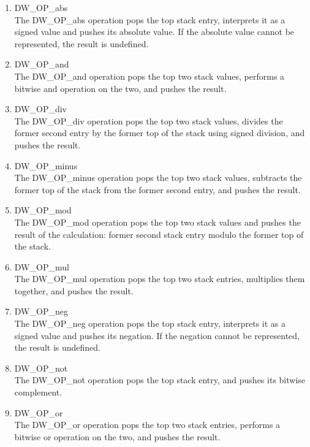 \begin{enumerate}[1]
\label{chap:DWOPabs}
\item DW\_OP\_abs  \\
The DW\_OP\_abs operation pops the top stack entry, interprets
it as a signed value and pushes its absolute value. If the
absolute value cannot be represented, the result is undefined.

\label{chap:DWOPand}
\item DW\_OP\_and \\
The DW\_OP\_and operation pops the top two stack values, performs
a bitwise and operation on the two, and pushes the result.

\label{chap:DWOPdiv}
\item DW\_OP\_div \\
The DW\_OP\_div operation pops the top two stack values, divides the former second entry by
the former top of the stack using signed division, and pushes the result.

\label{chap:DWOPminus}
\item DW\_OP\_minus \\
The DW\_OP\_minus operation pops the top two stack values, subtracts the former top of the
stack from the former second entry, and pushes the result.

\label{chap:DWOPmod}
\item DW\_OP\_mod \\
The DW\_OP\_mod operation pops the top two stack values and pushes the result of the
calculation: former second stack entry modulo the former top of the stack.

\label{chap:DWOPmul}
\item DW\_OP\_mul \\
The DW\_OP\_mul operation pops the top two stack entries, multiplies them together, and
pushes the result.

\label{chap:DWOPneg}
\item  DW\_OP\_neg \\
The DW\_OP\_neg operation pops the top stack entry, interprets
it as a signed value and pushes its negation. If the negation
cannot be represented, the result is undefined.

\label{chap:DWOPnot}
\item  DW\_OP\_not \\
The DW\_OP\_not operation pops the top stack entry, and pushes
its bitwise complement.

\label{chap:DWOPor}
\item  DW\_OP\_or \\
The DW\_OP\_or operation pops the top two stack entries, performs
a bitwise or operation on the two, and pushes the result.


\end{enumerate}
